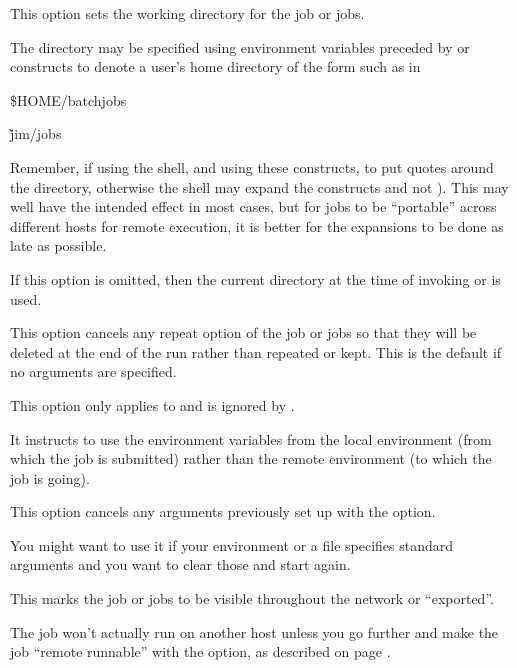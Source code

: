This option sets the working directory for the job or jobs.

The directory may be specified using environment variables preceded by \exampletext{\$} or constructs to denote a user's home directory
of the form  such as in

\begin{expara}

\$HOME/batchjobs

\~jim/jobs

\end{expara}

Remember, if using the shell, and using these constructs, to put quotes around the directory, otherwise the shell may expand the constructs and not
\ProductName{}). This may well have the intended effect in most cases, but for jobs to be ``portable'' across different
hosts for remote execution, it is better for the expansions to be done as late as possible.

If this option is omitted, then the current directory at the time of invoking \PrBtr{} or \PrRbtr{} is used.


This option cancels any repeat option of the job or jobs so that they will be deleted at the end of the run rather than repeated or kept. This is the
default if no arguments are specified.


This option only applies to \PrRbtr{} and is ignored by \PrBtr{}.

It instructs \PrRbtr{} to use the environment variables from the local environment (from which the job is submitted)
rather than the remote environment (to which the job is going).


This option cancels any arguments previously set up with the  option.

You might want to use it if your environment or a \configurationfile{} file specifies standard arguments and you want to clear those and start again.


This marks the job or jobs to be visible throughout the network or ``exported''.

The job won't actually run on another host unless you go further and make the job ``remote runnable'' with the
 option, as described on page \pageref{btr:fullexport}.


